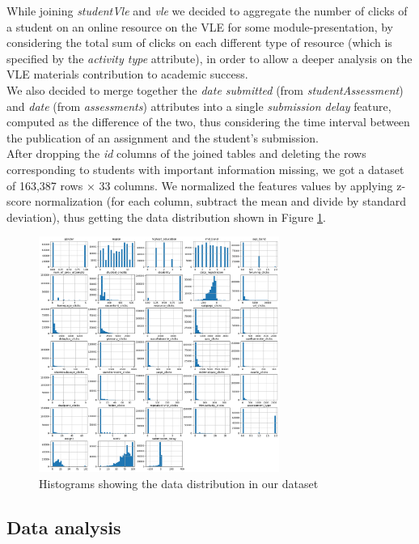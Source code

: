 \documentclass{article}
\begin{document}
While joining \textit{studentVle} and \textit{vle} we decided to aggregate the number of clicks of a student on an online resource on the VLE for some module-presentation, by considering the total sum of clicks on each different type of resource (which is specified by the \textit{activity type} attribute), in order to allow a deeper analysis on the VLE materials contribution to academic success.\\

We also decided to merge together the \textit{date submitted} (from \textit{studentAssessment}) and \textit{date} (from \textit{assessments}) attributes into a single \textit{submission delay} feature, computed as the difference of the two, thus considering the time interval between the publication of an assignment and the  student's submission.\\

After dropping the \textit{id} columns of the joined tables and deleting the rows corresponding to students with important information missing, we got a dataset of 163,387 rows × 33 columns. We normalized the features values by applying z-score normalization (for each column, subtract the mean and divide by standard deviation), thus getting the data distribution shown in Figure \ref{fig:distr}.\\


\begin{figure}
\centering
\includegraphics[width=0.7\textwidth]{data_distribution.png}
\caption{\label{fig:distr}Histograms showing the data distribution in our dataset}
\end{figure}

\subsection{Data analysis}
\end{document}
